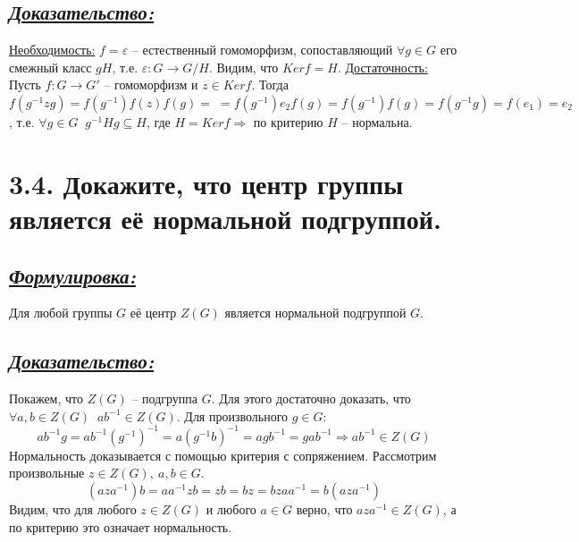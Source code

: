 \documentclass{article}
\begin{document}
\subsection*{\Large \underline{\textit{Доказательство: }}}
$ $\indent \underline{Необходимость:}
\newline $f = \varepsilon$ -- естественный гомоморфизм, сопоставляющий $\forall g \in G$ его смежный класс $gH$, т.е. $\varepsilon: G \rightarrow G / H$. Видим, что $Kerf = H$.
\newline \indent \underline{Достаточность:}
\newline Пусть $f : G \rightarrow G'$ -- гомоморфизм и $z \in Kerf$. Тогда $f(g^{-1}zg) = f(g^{-1})f(z)f(g) = \; = f(g^{-1})e_2f(g) = f(g^{-1})f(g) = f(g^{-1}g) = f(e_1) = e_2$, т.е. $\forall g \in G \;\; g^{-1}Hg \subseteq H$, где $H = Kerf \Rightarrow$ по критерию $H$ -- нормальна.

\section*{\LARGE 3.4. Докажите, что центр группы является её нормальной подгруппой. }
\subsection*{\Large \underline{\textit{Формулировка: }}}
Для любой группы $G$ её центр $Z(G)$ является нормальной подгруппой $G$.

\subsection*{\Large \underline{\textit{Доказательство: }}}
Покажем, что $Z(G)$ -- подгруппа $G$. Для этого достаточно доказать, что
\newline $\forall a,b \in Z(G) \;\; a b^{-1} \in Z(G)$. Для произвольного $g \in G$:
$$
a b^{-1}  g = a b^{-1}(g^{-1})^{-1} = a(g^{-1} b)^{-1} = a g  b^{-1} = g  a  b^{-1} \Rightarrow a b^{-1} \in Z(G)
$$
Нормальность доказывается с помощью критерия с сопряжением. Рассмотрим произвольные $z\in Z(G), \: a, b \in G$.
$$ 
(a z a^{-1}) b = a a^{-1}  z  b = z  b = b  z = b  z  a  a^{-1} = b  (a   z   a^{-1})
$$
Видим, что для любого $z \in Z(G)$ и любого $a \in G$ верно, что $aza^{-1}\in Z(G)$, а по критерию это означает нормальность.

\end{document}
